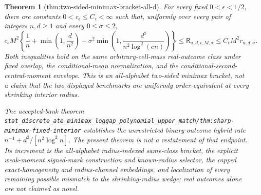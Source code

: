 \documentclass{article}
\newtheorem{theorem}{Theorem}
\begin{document}
\begin{theorem}[thm:two-sided-minimax-bracket-all-d]\label{thm:two-sided-minimax-bracket-all-d}
For every fixed \(0<\epsilon<1/2\), there are constants \(0<c_{\epsilon}\le C_{\epsilon}<\infty\) such that, uniformly over every pair of integers \(n,d\ge1\) and every \(0\le\sigma\le2\),
\[
 c_{\epsilon}M^2\left\{\frac1n+\min\left(1,\frac d{n^2}\right)+\sigma^2\min\left(1,\frac{d^2}{n^2\log^2(en)}\right)\right\}
 \le\mathsf R_{n,d,\epsilon,M,\sigma}
 \le C_{\epsilon}M^2r_{n,d,\sigma}.
\]
Both inequalities hold on the same arbitrary-cell-mass real-outcome class under fixed overlap, the conditional-mean normalization, and the conditional-second-central-moment envelope.  This is an all-alphabet two-sided minimax bracket, not a claim that the two displayed benchmarks are uniformly order-equivalent at every shrinking interior radius.

The accepted-bank theorem \texttt{stat\_discrete\_ate\_minimax\_loggap\_polynomial\_upper\_match/thm:sharp-minimax-fixed-interior} establishes the unrestricted binary-outcome hybrid rate \(n^{-1}+d^2/[n^2\log^2 n]\).  The present theorem is not a restatement of that endpoint.  Its increment is the all-alphabet radius-indexed same-class bracket, the explicit weak-moment signed-mark construction and known-radius selector, the capped exact-homogeneity and radius-channel embeddings, and localization of every remaining possible mismatch to the shrinking-radius wedge; real outcomes alone are not claimed as novel.
\end{theorem}
\end{document}
